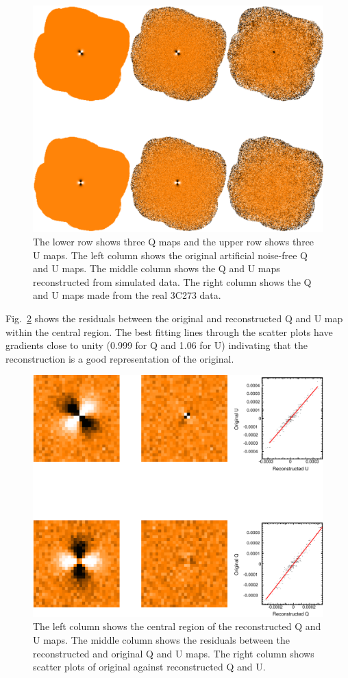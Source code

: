 \documentclass[twoside,11pt]{starlink}
\begin{document}
\begin{figure}
\includegraphics[width=\columnwidth]{recon1}
\caption{The lower row shows three Q maps and the upper row shows three U
maps. The left column shows the original artificial noise-free Q and U
maps. The middle column shows the Q and U maps reconstructed from
simulated data. The right column shows the Q and U maps made from the real
3C273 data.}
\label{fig:recon1}
\end{figure}

Fig.~\ref{fig:recon2} shows the residuals between the original and
reconstructed Q and U map within the central region. The best
fitting lines through the scatter plots have gradients close to unity
(0.999 for Q and 1.06 for U) indivating that the reconstruction is
a good representation of the original.

\begin{figure}
\includegraphics[width=\columnwidth]{recon2}
\caption{The left column shows the central region of the reconstructed Q
and U maps. The middle column shows the residuals between the
reconstructed and original Q and U maps. The right column shows
scatter plots of original against reconstructed Q and U. }
\label{fig:recon2}
\end{figure}
\end{document}
